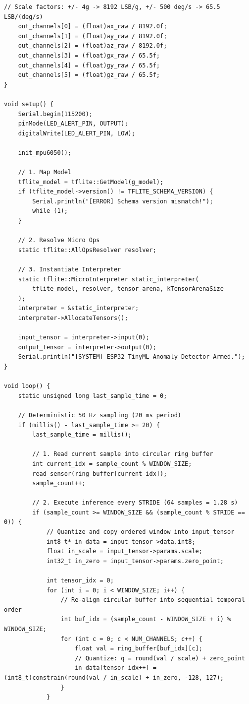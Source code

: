 \begin{lstlisting}[style=pythonstyle, caption={Production ESP32 C++ Anomaly Detection Firmware with TFLM.}, label={lst:esp32_firmware}]
    // Scale factors: +/- 4g -> 8192 LSB/g, +/- 500 deg/s -> 65.5 LSB/(deg/s)
    out_channels[0] = (float)ax_raw / 8192.0f;
    out_channels[1] = (float)ay_raw / 8192.0f;
    out_channels[2] = (float)az_raw / 8192.0f;
    out_channels[3] = (float)gx_raw / 65.5f;
    out_channels[4] = (float)gy_raw / 65.5f;
    out_channels[5] = (float)gz_raw / 65.5f;
}

void setup() {
    Serial.begin(115200);
    pinMode(LED_ALERT_PIN, OUTPUT);
    digitalWrite(LED_ALERT_PIN, LOW);

    init_mpu6050();

    // 1. Map Model
    tflite_model = tflite::GetModel(g_model);
    if (tflite_model->version() != TFLITE_SCHEMA_VERSION) {
        Serial.println("[ERROR] Schema version mismatch!");
        while (1);
    }

    // 2. Resolve Micro Ops
    static tflite::AllOpsResolver resolver;

    // 3. Instantiate Interpreter
    static tflite::MicroInterpreter static_interpreter(
        tflite_model, resolver, tensor_arena, kTensorArenaSize
    );
    interpreter = &static_interpreter;
    interpreter->AllocateTensors();

    input_tensor = interpreter->input(0);
    output_tensor = interpreter->output(0);
    Serial.println("[SYSTEM] ESP32 TinyML Anomaly Detector Armed.");
}

void loop() {
    static unsigned long last_sample_time = 0;
    
    // Deterministic 50 Hz sampling (20 ms period)
    if (millis() - last_sample_time >= 20) {
        last_sample_time = millis();

        // 1. Read current sample into circular ring buffer
        int current_idx = sample_count % WINDOW_SIZE;
        read_sensor(ring_buffer[current_idx]);
        sample_count++;

        // 2. Execute inference every STRIDE (64 samples = 1.28 s)
        if (sample_count >= WINDOW_SIZE && (sample_count % STRIDE == 0)) {
            // Quantize and copy ordered window into input_tensor
            int8_t* in_data = input_tensor->data.int8;
            float in_scale = input_tensor->params.scale;
            int32_t in_zero = input_tensor->params.zero_point;
            
            int tensor_idx = 0;
            for (int i = 0; i < WINDOW_SIZE; i++) {
                // Re-align circular buffer into sequential temporal order
                int buf_idx = (sample_count - WINDOW_SIZE + i) % WINDOW_SIZE;
                for (int c = 0; c < NUM_CHANNELS; c++) {
                    float val = ring_buffer[buf_idx][c];
                    // Quantize: q = round(val / scale) + zero_point
                    in_data[tensor_idx++] = (int8_t)constrain(round(val / in_scale) + in_zero, -128, 127);
                }
            }


\end{lstlisting}
